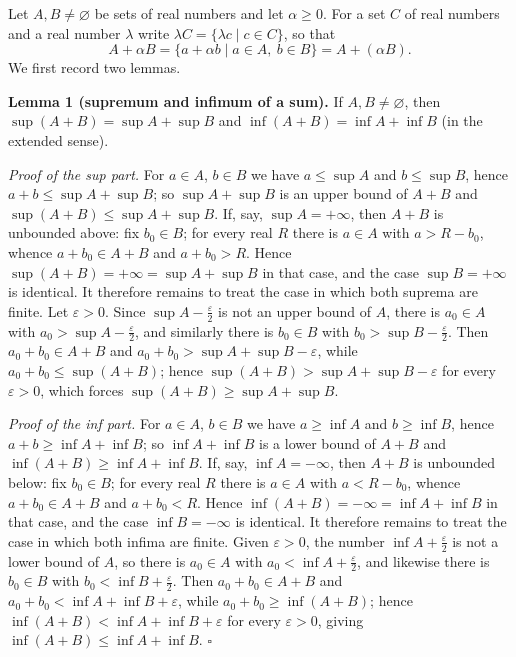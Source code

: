 \documentclass[11pt,a4paper]{article}
\newenvironment{solution}[1]{%
  \par\addvspace{1.7ex}%
  \noindent{\color{solutioncolor}\textbf{#1}}\hspace{0.55em}\ignorespaces}%
  {\par\addvspace{0.9ex}}
\begin{document}
\begin{solution}{Solution 2.4.8}\label{xs:2.4.8}
Let $A, B \ne \varnothing$ be sets of real numbers and let $\alpha \ge 0$. For a set $C$ of real numbers and a real number $\lambda$ write $\lambda C = \{\lambda c \mid c \in C\}$, so that
\[
A + \alpha B = \{a + \alpha b \mid a \in A,\ b \in B\} = A + (\alpha B).
\]
We first record two lemmas.

\medskip
\noindent\textbf{Lemma 1 (supremum and infimum of a sum).} If $A, B \ne \varnothing$, then $\sup(A+B) = \sup A + \sup B$ and $\inf(A+B) = \inf A + \inf B$ (in the extended sense).

\emph{Proof of the sup part.} For $a \in A$, $b \in B$ we have $a \le \sup A$ and $b \le \sup B$, hence $a + b \le \sup A + \sup B$; so $\sup A + \sup B$ is an upper bound of $A + B$ and $\sup(A+B) \le \sup A + \sup B$. If, say, $\sup A = +\infty$, then $A + B$ is unbounded above: fix $b_0 \in B$; for every real $R$ there is $a \in A$ with $a > R - b_0$, whence $a + b_0 \in A + B$ and $a + b_0 > R$. Hence $\sup(A+B) = +\infty = \sup A + \sup B$ in that case, and the case $\sup B = +\infty$ is identical. It therefore remains to treat the case in which both suprema are finite. Let $\varepsilon > 0$. Since $\sup A - \frac{\varepsilon}{2}$ is not an upper bound of $A$, there is $a_0 \in A$ with $a_0 > \sup A - \frac{\varepsilon}{2}$, and similarly there is $b_0 \in B$ with $b_0 > \sup B - \frac{\varepsilon}{2}$. Then $a_0 + b_0 \in A + B$ and $a_0 + b_0 > \sup A + \sup B - \varepsilon$, while $a_0 + b_0 \le \sup(A+B)$; hence $\sup(A+B) > \sup A + \sup B - \varepsilon$ for every $\varepsilon > 0$, which forces $\sup(A+B) \ge \sup A + \sup B$.

\emph{Proof of the inf part.} For $a \in A$, $b \in B$ we have $a \ge \inf A$ and $b \ge \inf B$, hence $a + b \ge \inf A + \inf B$; so $\inf A + \inf B$ is a lower bound of $A+B$ and $\inf(A+B) \ge \inf A + \inf B$. If, say, $\inf A = -\infty$, then $A+B$ is unbounded below: fix $b_0 \in B$; for every real $R$ there is $a \in A$ with $a < R - b_0$, whence $a + b_0 \in A + B$ and $a + b_0 < R$. Hence $\inf(A+B) = -\infty = \inf A + \inf B$ in that case, and the case $\inf B = -\infty$ is identical. It therefore remains to treat the case in which both infima are finite. Given $\varepsilon > 0$, the number $\inf A + \frac{\varepsilon}{2}$ is not a lower bound of $A$, so there is $a_0 \in A$ with $a_0 < \inf A + \frac{\varepsilon}{2}$, and likewise there is $b_0 \in B$ with $b_0 < \inf B + \frac{\varepsilon}{2}$. Then $a_0 + b_0 \in A + B$ and $a_0 + b_0 < \inf A + \inf B + \varepsilon$, while $a_0 + b_0 \ge \inf(A+B)$; hence $\inf(A+B) < \inf A + \inf B + \varepsilon$ for every $\varepsilon > 0$, giving $\inf(A+B) \le \inf A + \inf B$. $\square$


\end{solution}
\end{document}
